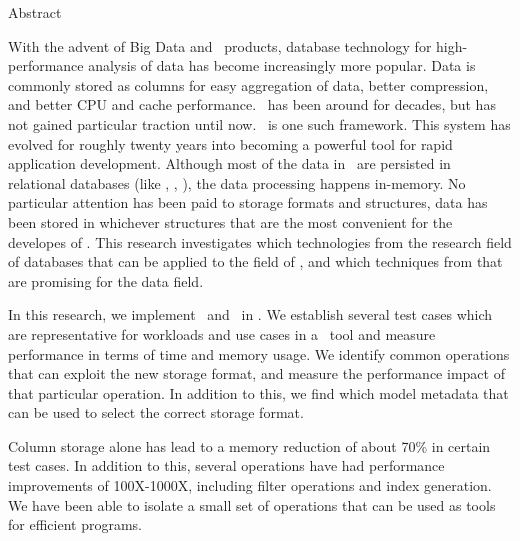 {\centering

    {\Huge Abstract}
    \vspace{1cm}
    
    With the advent of Big Data and \bd~products, database technology for high-performance analysis of data has become increasingly more popular. Data is commonly stored as columns for easy aggregation of data, better compression, and better CPU and cache performance. \mdd~has been around for decades, but has not gained particular traction until now. \genusSoftware~is one such framework. This system has evolved for roughly twenty years into becoming a powerful tool for rapid application development. Although most of the data in \genusSoftware~are persisted in relational databases (like \oracle, \mssql, \mysql), the data processing happens in-memory. No particular attention has been paid to storage formats and structures, data has been stored in whichever structures that are the most convenient for the developes of \genusSoftware. This research investigates which technologies from the research field of databases that can be applied to the field of \mdd, and which techniques from \mdd that are promising for the data field.

    In this research, we implement \cs~and \de~in \genusSoftware. We establish several test cases which are representative for workloads and use cases in a \mdd~tool and measure performance in terms of time and memory usage. We identify common operations that can exploit the new storage format, and measure the performance impact of that particular operation. In addition to this, we find which model metadata that can be used to select the correct storage format.

    Column storage alone has lead to a memory reduction of about 70\% in certain test cases. In addition to this, several operations have had performance improvements of 100X-1000X, including filter operations and index generation. We have been able to isolate a small set of operations that can be used as tools for efficient programs.
    

}
\clearpage
